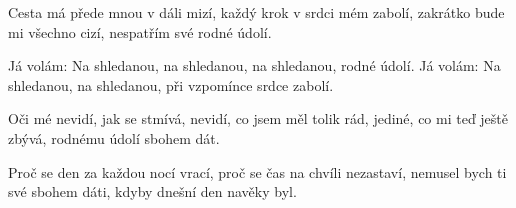 
\beginverse{}
Cesta má přede mnou v dáli mizí,
každý krok v srdci mém zabolí,
zakrátko bude mi všechno cizí,
nespatřím své rodné údolí.
\endverse{}

\beginchorus{}
Já volám: Na shledanou, na shledanou,
na shledanou, rodné údolí.
Já volám: Na shledanou, na shledanou,
při vzpomínce srdce zabolí.
\endchorus{}

\beginverse{}
Oči mé nevidí, jak se stmívá,
nevidí, co jsem měl tolik rád,
jediné, co mi teď ještě zbývá,
rodnému údolí sbohem dát.
\endverse{}

\beginchorus{}

\endchorus{}

\beginverse{}
Proč se den za každou nocí vrací,
proč se čas na chvíli nezastaví,
nemusel bych ti své sbohem dáti,
kdyby dnešní den navěky byl.
\endverse{}

\beginchorus{}

\endchorus{}

\endsong{}

